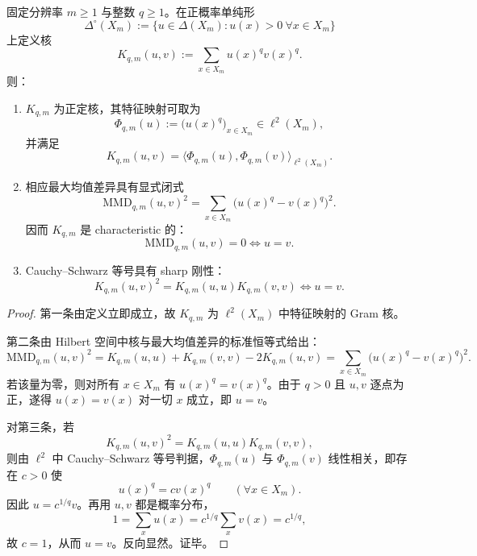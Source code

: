 \begin{theorem}\label{thm:conclusion-mixed-collision-characteristic-hilbert-geometry}
固定分辨率 \(m\ge 1\) 与整数 \(q\ge 1\)。在正概率单纯形
\[
\Delta^\circ(X_m):=\{u\in \Delta(X_m):u(x)>0\ \forall x\in X_m\}
\]
上定义核
\[
K_{q,m}(u,v):=\sum_{x\in X_m}u(x)^qv(x)^q.
\]
则：
\begin{enumerate}
  \item \(K_{q,m}\) 为正定核，其特征映射可取为
  \[
  \Phi_{q,m}(u):=\bigl(u(x)^q\bigr)_{x\in X_m}\in \ell^2(X_m),
  \]
  并满足
  \[
  K_{q,m}(u,v)=\langle \Phi_{q,m}(u),\Phi_{q,m}(v)\rangle_{\ell^2(X_m)}.
  \]
  \item 相应最大均值差异具有显式闭式
  \[
  \mathrm{MMD}_{q,m}(u,v)^2
  =\sum_{x\in X_m}\bigl(u(x)^q-v(x)^q\bigr)^2.
  \]
  因而 \(K_{q,m}\) 是 characteristic 的：
  \[
  \mathrm{MMD}_{q,m}(u,v)=0\iff u=v.
  \]
  \item Cauchy--Schwarz 等号具有 sharp 刚性：
  \[
  K_{q,m}(u,v)^2=K_{q,m}(u,u)K_{q,m}(v,v)
  \iff u=v.
  \]
\end{enumerate}
\end{theorem}
\begin{proof}
第一条由定义立即成立，故 \(K_{q,m}\) 为 \(\ell^2(X_m)\) 中特征映射的 Gram 核。

第二条由 Hilbert 空间中核与最大均值差异的标准恒等式给出：
\[
\mathrm{MMD}_{q,m}(u,v)^2
=K_{q,m}(u,u)+K_{q,m}(v,v)-2K_{q,m}(u,v)
=\sum_{x\in X_m}\bigl(u(x)^q-v(x)^q\bigr)^2.
\]
若该量为零，则对所有 \(x\in X_m\) 有 \(u(x)^q=v(x)^q\)。由于 \(q>0\) 且 \(u,v\) 逐点为正，遂得 \(u(x)=v(x)\) 对一切 \(x\) 成立，即 \(u=v\)。

对第三条，若
\[
K_{q,m}(u,v)^2=K_{q,m}(u,u)K_{q,m}(v,v),
\]
则由 \(\ell^2\) 中 Cauchy--Schwarz 等号判据，\(\Phi_{q,m}(u)\) 与 \(\Phi_{q,m}(v)\) 线性相关，即存在 \(c>0\) 使
\[
u(x)^q=cv(x)^q\qquad (\forall x\in X_m).
\]
因此 \(u=c^{1/q}v\)。再用 \(u,v\) 都是概率分布，
\[
1=\sum_x u(x)=c^{1/q}\sum_x v(x)=c^{1/q},
\]
故 \(c=1\)，从而 \(u=v\)。反向显然。证毕。
\end{proof}


